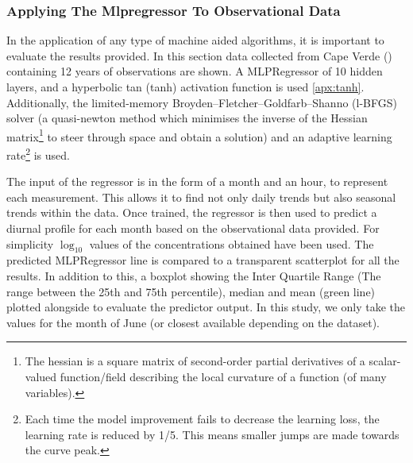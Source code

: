\subsubsection{Applying The Mlpregressor To Observational Data}
In the application of any type of machine aided algorithms, it is important to evaluate the results provided. In this section data collected from Cape Verde (\citep{capeverde}) containing 12 years of observations are shown. A MLPRegressor of 10 hidden layers, and a hyperbolic tan (tanh) activation function is used \autoref{apx:tanh}. Additionally, the limited-memory Broyden–Fletcher–Goldfarb–Shanno (l-BFGS) solver (a quasi-newton method which minimises the inverse of the Hessian matrix\footnote{ The hessian is a square matrix of second-order partial derivatives of a scalar-valued function/field describing the local curvature of a function (of many variables).} to steer through space and obtain a solution) and an adaptive learning rate\footnote{Each time the model improvement fails to decrease the learning loss, the learning rate is reduced by 1/5. This means smaller jumps are made towards the curve peak. } is used.

The input of the regressor is in the form of a month and an hour, to represent each measurement. This allows it to find not only daily trends but also seasonal trends within the data. Once trained, the regressor is then used to predict a diurnal profile for each month based on the observational data provided. For simplicity $\log_{10}$ values of the concentrations obtained have been used. The predicted MLPRegressor line is compared to a transparent scatterplot for all the results. In addition to this, a boxplot showing the Inter Quartile Range (The range between the 25th and 75th percentile), median and mean (green line) plotted alongside to evaluate the predictor output. In this study, we only take the values for the month of June (or closest available depending on the dataset).

